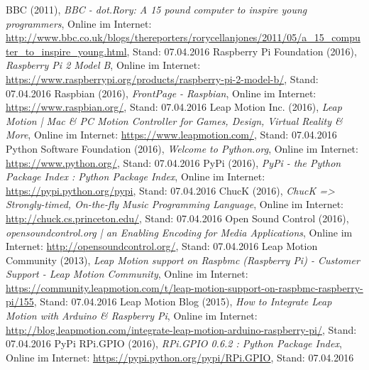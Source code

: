 \documentclass[a4paper, fontsize=12pt, toc=bibliographynumbered]{scrreprt}
\begin{document}
\renewcommand{\bibname}{Quellenverzeichnis}
\begin{thebibliography}{9}

BBC (2011), \emph{BBC - dot.Rory: A 15 pound computer to
    inspire young programmers}, Online im Internet:
  \url{http://www.bbc.co.uk/blogs/thereporters/rorycellanjones/2011/05/a_15_computer_to_inspire_young.html},
  Stand: 07.04.2016
Raspberry Pi Foundation (2016), \emph{Raspberry Pi
    2 Model B}, Online im Internet:
  \url{https://www.raspberrypi.org/products/raspberry-pi-2-model-b/},
  Stand: 07.04.2016
Raspbian (2016), \emph{FrontPage - Raspbian}, Online
  im Internet: \url{https://www.raspbian.org/}, Stand: 07.04.2016
Leap Motion Inc. (2016), \emph{Leap Motion | Mac
    \& PC Motion Controller for Games, Design, Virtual Reality \&
    More}, Online im Internet: \url{https://www.leapmotion.com/},
  Stand: 07.04.2016
Python Software Foundation (2016), \emph{Welcome to
    Python.org}, Online im Internet: \url{https://www.python.org/},
  Stand: 07.04.2016
PyPi (2016), \emph{PyPi - the Python Package Index :
    Python Package Index}, Online im Internet:
  \url{https://pypi.python.org/pypi}, Stand: 07.04.2016
ChucK (2016), \emph{ChucK => Strongly-timed, On-the-fly
    Music Programming Language}, Online im Internet:
  \url{http://chuck.cs.princeton.edu/}, Stand: 07.04.2016
Open Sound Control (2016), \emph{opensoundcontrol.org |
    an Enabling Encoding for Media Applications}, Online im Internet:
  \url{http://opensoundcontrol.org/}, Stand: 07.04.2016
Leap Motion Community (2013), \emph{Leap
    Motion support on Raspbmc (Raspberry Pi) - Customer Support - Leap
    Motion Community}, Online im Internet:
  \url{https://community.leapmotion.com/t/leap-motion-support-on-raspbmc-raspberry-pi/155},
  Stand: 07.04.2016
Leap Motion Blog (2015), \emph{How to
    Integrate Leap Motion with Arduino \& Raspberry Pi}, Online im
  Internet:
  \url{http://blog.leapmotion.com/integrate-leap-motion-arduino-raspberry-pi/},
  Stand: 07.04.2016
PyPi RPi.GPIO (2016), \emph{RPi.GPIO 0.6.2 : Python
    Package Index}, Online im Internet:
  \url{https://pypi.python.org/pypi/RPi.GPIO}, Stand: 07.04.2016

\end{thebibliography}
\end{document}
